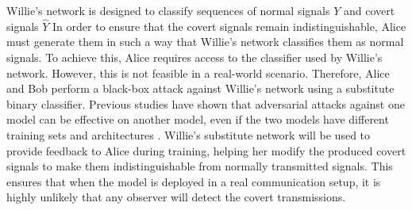 Willie's network is designed to classify sequences of normal signals \(Y\) and covert signals \(\hat{Y}\) In order to ensure that the covert signals remain indistinguishable, Alice must generate them in such a way that Willie's network classifies them as normal signals. To achieve this, Alice requires access to the classifier used by Willie's network. However, this is not feasible in a real-world scenario. Therefore, Alice and Bob perform a black-box attack against Willie's network using a substitute binary classifier. Previous studies have shown that adversarial attacks against one model can be effective on another model, even if the two models have different training sets and architectures \cite{papernot2016transferability}. Willie's substitute network will be used to provide feedback to Alice during training, helping her modify the produced covert signals to make them indistinguishable from normally transmitted signals. This ensures that when the model is deployed in a real communication setup, it is highly unlikely that any observer will detect the covert transmissions.

